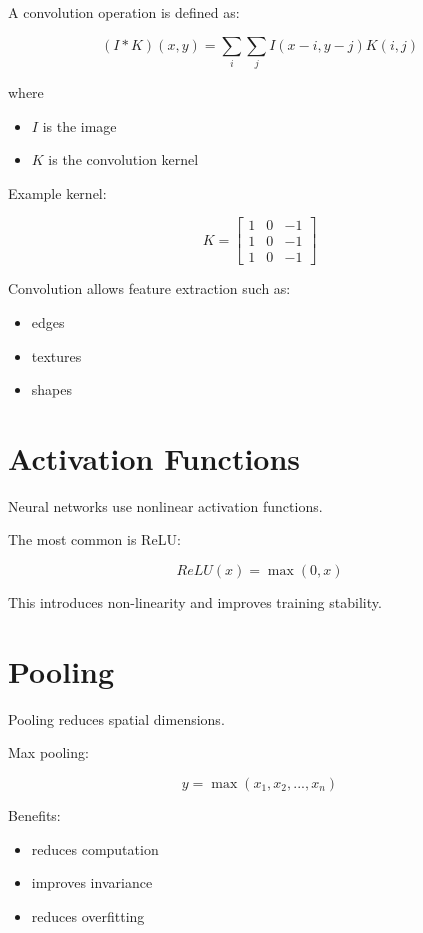 ﻿\documentclass[11pt]{article}
\begin{document}
A convolution operation is defined as:

\[
(I * K)(x,y) = \sum_i \sum_j I(x-i,y-j)K(i,j)
\]

where

\begin{itemize}
\item $I$ is the image
\item $K$ is the convolution kernel
\end{itemize}

Example kernel:

\[
K =
\begin{bmatrix}
1 & 0 & -1 \\
1 & 0 & -1 \\
1 & 0 & -1
\end{bmatrix}
\]

Convolution allows feature extraction such as:

\begin{itemize}
\item edges
\item textures
\item shapes
\end{itemize}

\section{Activation Functions}

Neural networks use nonlinear activation functions.

The most common is ReLU:

\[
ReLU(x) = \max(0,x)
\]

This introduces non-linearity and improves training stability.

\section{Pooling}

Pooling reduces spatial dimensions.

Max pooling:

\[
y = \max(x_1,x_2,...,x_n)
\]

Benefits:

\begin{itemize}
\item reduces computation
\item improves invariance
\item reduces overfitting
\end{itemize}
\end{document}

